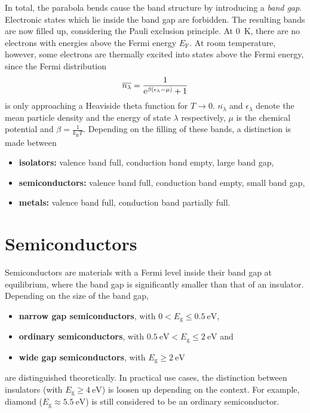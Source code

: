 In total, the parabola bends cause the band structure by introducing a \textit{band gap}.
Electronic states which lie inside the band gap are forbidden.
The resulting bands are now filled up, considering the Pauli exclusion principle.
At \SI{0}{\kelvin}, there are no electrons with energies above the Fermi energy $E_\text{F}$.
At room temperature, however, some electrons are thermally excited into states above the Fermi energy, since the Fermi distribution
\begin{equation*}
  \overline{n_\lambda} = \frac{1}{\mathrm{e}^{\beta\left(\epsilon_\lambda-\mu\right)} + 1}
\end{equation*}
is only approaching a Heaviside theta function for $T\rightarrow 0$.
$\overline{n_\lambda}$ and $\epsilon_\lambda$ denote the mean particle density and the energy of state $\lambda$ respectively, $\mu$ is the chemical potential and $\beta=\frac{1}{k_\text{B}T}$.
Depending on the filling of these bands, a distinction is made between
\begin{itemize}
	\item \textbf{isolators:} valence band full, conduction band empty, large band gap,
	\item \textbf{semiconductors:} valence band full, conduction band empty, small band gap,
	\item \textbf{metals:} valence band full, conduction band partially full.
\end{itemize}

\section{Semiconductors}
Semiconductors are materials with a Fermi level inside their band gap at equilibrium, where the band gap is significantly smaller than that of an insulator.
Depending on the size of the band gap,
\begin{itemize}
	\item \textbf{narrow gap semiconductors}, with $0<E_\text{g}\leq\SI{0.5}{\eV}$,
	\item \textbf{ordinary semiconductors}, with $\SI{0.5}{\eV}<E_\text{g}\leq\SI{2}{\eV}$ and
	\item \textbf{wide gap semiconductors}, with $E_\text{g}\geq\SI{2}{\eV}$
\end{itemize}
are distinguished theoretically.
In practical use cases, the distinction between insulators (with $E_\text{g}\geq\SI{4}{\eV}$) is loosen up depending on the context.
For example, diamond ($E_\text{g}\approx\SI{5.5}{\eV}$) is still considered to be an ordinary semiconductor.

